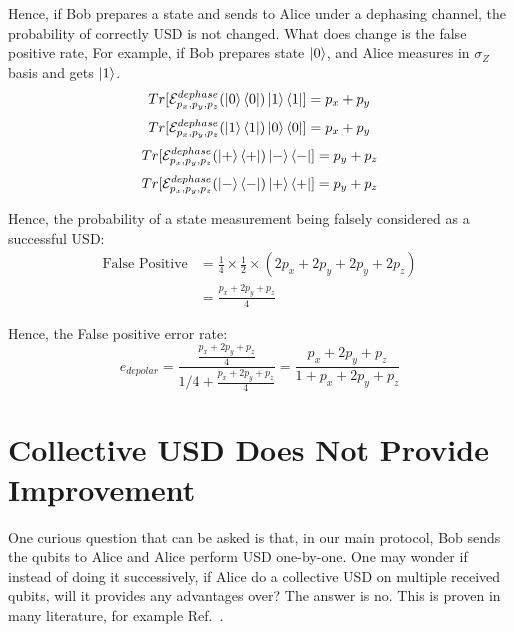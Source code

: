 \documentclass[%
 reprint,
superscriptaddress,
 amsmath,amssymb,
 aps,
]{revtex4-2}
\begin{document}
Hence, if Bob prepares a state and sends to Alice under a dephasing channel, the probability of correctly USD is not changed. What does change is the false positive rate, For example, if Bob prepares state $\ket{0}$, and Alice measures in $\sigma_Z$ basis and gets $\ket{1}$.
\begin{equation}
Tr[\mathcal{E}^{dephase}_{p_x, p_y, p_z}(\ket{0}\bra{0})\ket{1}\bra{1}]=p_x+p_y
\end{equation}
\begin{equation}
Tr[\mathcal{E}^{dephase}_{p_x, p_y, p_z}(\ket{1}\bra{1})\ket{0}\bra{0}]=p_x+p_y
\end{equation}
\begin{equation}
Tr[\mathcal{E}^{dephase}_{p_x, p_y, p_z}(\ket{+}\bra{+})\ket{-}\bra{-}]=p_y+p_z
\end{equation}
\begin{equation}
Tr[\mathcal{E}^{dephase}_{p_x, p_y, p_z}(\ket{-}\bra{-})\ket{+}\bra{+}]=p_y+p_z
\end{equation}

Hence, the probability of a state measurement being falsely considered as a successful USD:
\begin{equation}
\begin{split}
    \text{False Positive}&=\frac{1}{4}\times\frac{1}{2}\times\left(2p_x+2p_y+2p_y+2p_z\right)\\
    &=\frac{p_x+2p_y+p_z}{4}
    \end{split}
\end{equation}

Hence, the False positive error rate:
\begin{equation}
    e_{depolar}=\frac{\frac{p_x+2p_y+p_z}{4}}{1/4+\frac{p_x+2p_y+p_z}{4}}=\frac{p_x+2p_y+p_z}{1+p_x+2p_y+p_z}
\end{equation}

\section{Collective USD Does Not Provide Improvement}

One curious question that can be asked is that, in our main protocol, Bob sends the qubits to Alice and Alice perform USD one-by-one. One may wonder if instead of doing it successively, if Alice do a collective USD on multiple received qubits, will it provides any advantages over? The answer is no. This is proven in many literature, for example Ref.~\cite{USD_one_by_one}.



\end{document}
